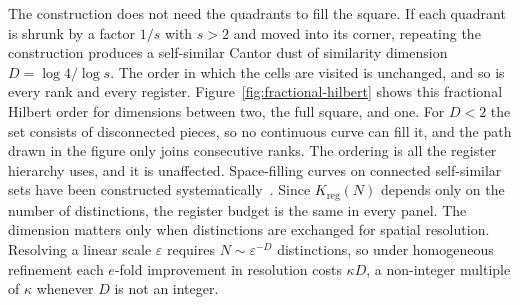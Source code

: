 The construction does not need the quadrants to fill the square. If
each quadrant is shrunk by a factor $1/s$ with $s>2$ and moved into its
corner, repeating the construction produces a self-similar Cantor dust
of similarity dimension $D=\log4/\log s$. The order in which the cells
are visited is unchanged, and so is every rank and every register.
Figure~\ref{fig:fractional-hilbert} shows this fractional Hilbert order
for dimensions between two, the full square, and one. For $D<2$ the set
consists of disconnected pieces, so no continuous curve can fill it,
and the path drawn in the figure only joins consecutive ranks. The
ordering is all the register hierarchy uses, and it is unaffected.
Space-filling curves on connected self-similar sets have been
constructed systematically~\cite{rao2016spacefilling}. Since
$K_{\mathrm{reg}}(N)$ depends only on the number of distinctions, the
register budget is the same in every panel. The dimension matters only
when distinctions are exchanged for spatial resolution. Resolving a
linear scale $\varepsilon$ requires $N\sim\varepsilon^{-D}$
distinctions, so under homogeneous refinement each $e$-fold improvement
in resolution costs $\kappa D$, a non-integer multiple of $\kappa$
whenever $D$ is not an integer.

